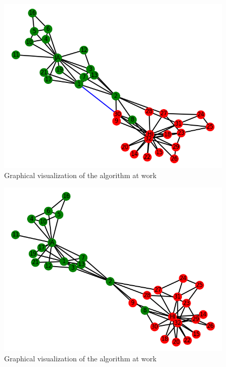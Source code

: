 \documentclass[11pt]{article}
\begin{document}
	\begin{figure}[h!]
		\includegraphics[scale=0.5]{resources/myplot10.png}
		\caption{Graphical visualization of the algorithm at work }
	\end{figure}
	\begin{figure}[h!]
		\includegraphics[scale=0.5]{resources/myplot9.png}
		\caption{Graphical visualization of the algorithm at work }
	\end{figure}
\end{document}
